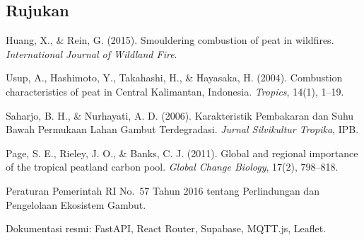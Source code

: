 \documentclass[11pt,a4paper]{article}
\begin{document}
\subsection*{Rujukan}
\begin{enumerate}[label={[\arabic*]}]
  \item Huang, X., \& Rein, G. (2015). Smouldering combustion of peat in wildfires. \textit{International Journal of Wildland Fire}.
  \item Usup, A., Hashimoto, Y., Takahashi, H., \& Hayasaka, H. (2004). Combustion characteristics of peat in Central Kalimantan, Indonesia. \textit{Tropics}, 14(1), 1--19.
  \item Saharjo, B. H., \& Nurhayati, A. D. (2006). Karakteristik Pembakaran dan Suhu Bawah Permukaan Lahan Gambut Terdegradasi. \textit{Jurnal Silvikultur Tropika}, IPB.
  \item Page, S. E., Rieley, J. O., \& Banks, C. J. (2011). Global and regional importance of the tropical peatland carbon pool. \textit{Global Change Biology}, 17(2), 798--818.
  \item Peraturan Pemerintah RI No.~57 Tahun 2016 tentang Perlindungan dan Pengelolaan Ekosistem Gambut.
  \item Dokumentasi resmi: FastAPI, React Router, Supabase, MQTT.js, Leaflet.
\end{enumerate}
\end{document}
